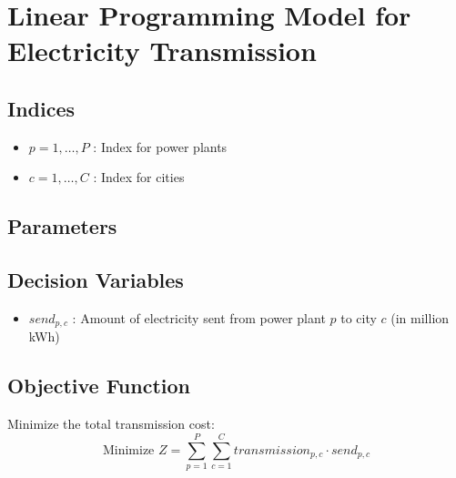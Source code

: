 \documentclass{article}
\begin{document}
\section*{Linear Programming Model for Electricity Transmission}

\subsection*{Indices}
\begin{itemize}
    \item $p = 1, \ldots, P$ : Index for power plants
    \item $c = 1, \ldots, C$ : Index for cities
\end{itemize}

\subsection*{Parameters}

\subsection*{Decision Variables}
\begin{itemize}
    \item $send_{p,c}$ : Amount of electricity sent from power plant $p$ to city $c$ (in million kWh)
\end{itemize}

\subsection*{Objective Function}
Minimize the total transmission cost:
\[
\text{Minimize } Z = \sum_{p=1}^{P} \sum_{c=1}^{C} transmission_{p,c} \cdot send_{p,c}
\]
\end{document}
